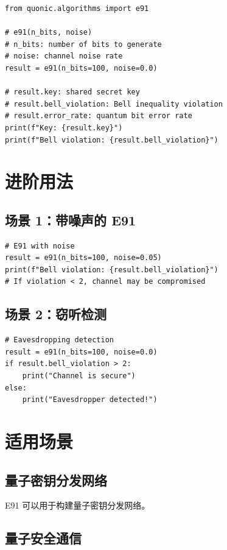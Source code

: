 \documentclass[12pt,a4paper]{article}
\begin{document}
\begin{lstlisting}[style=python]
from quonic.algorithms import e91

# e91(n_bits, noise)
# n_bits: number of bits to generate
# noise: channel noise rate
result = e91(n_bits=100, noise=0.0)

# result.key: shared secret key
# result.bell_violation: Bell inequality violation
# result.error_rate: quantum bit error rate
print(f"Key: {result.key}")
print(f"Bell violation: {result.bell_violation}")
\end{lstlisting}

\section{进阶用法}

\subsection{场景 1：带噪声的 E91}

\begin{lstlisting}[style=python]
# E91 with noise
result = e91(n_bits=100, noise=0.05)
print(f"Bell violation: {result.bell_violation}")
# If violation < 2, channel may be compromised
\end{lstlisting}

\subsection{场景 2：窃听检测}

\begin{lstlisting}[style=python]
# Eavesdropping detection
result = e91(n_bits=100, noise=0.0)
if result.bell_violation > 2:
    print("Channel is secure")
else:
    print("Eavesdropper detected!")
\end{lstlisting}

\section{适用场景}

\subsection{量子密钥分发网络}

E91 可以用于构建量子密钥分发网络。

\subsection{量子安全通信}
\end{document}
